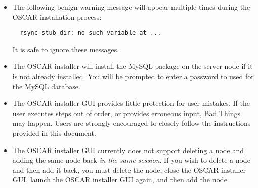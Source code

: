 \begin{itemize}
\item The following benign warning message will appear multiple times
  during the OSCAR installation process:

\begin{verbatim}
  rsync_stub_dir: no such variable at ...
\end{verbatim}

  It is safe to ignore these messages.
  
\item The OSCAR installer will install the MySQL package on the server
  node if it is not already installed.  You will be prompted to enter a
  password to used for the MySQL database.
  
\item The OSCAR installer GUI provides little protection for user
  mistakes.  If the user executes steps out of order, or provides
  erroneous input, Bad Things may happen.  Users are strongly
  encouraged to closely follow the instructions provided in this
  document.

\item The OSCAR installer GUI currently does not support deleting a
  node and adding the same node back {\em in the same session}.  If
  you wish to delete a node and then add it back, you must delete the
  node, close the OSCAR installer GUI, launch the OSCAR installer GUI
  again, and then add the node.

\end{itemize}

